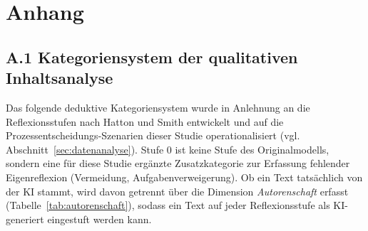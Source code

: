 \chapter*{Anhang}

\setcounter{table}{0}
\setcounter{figure}{0}
\renewcommand{\thetable}{A.\arabic{table}}
\renewcommand{\thefigure}{A.\arabic{figure}}

\section*{A.1 Kategoriensystem der qualitativen Inhaltsanalyse}
\label{app:kategoriensystem}

Das folgende deduktive Kategoriensystem wurde in Anlehnung an die Reflexionsstufen nach Hatton und
Smith \cite{hattonSmithReflectionTeacherEducation1995} entwickelt und auf die
Prozessentscheidungs-Szenarien dieser Studie operationalisiert (vgl. Abschnitt~\ref{sec:datenanalyse}).
Stufe 0 ist keine Stufe des Originalmodells, sondern eine für diese Studie ergänzte
Zusatzkategorie zur Erfassung fehlender Eigenreflexion (Vermeidung, Aufgabenverweigerung). Ob ein
Text tatsächlich von der KI stammt, wird davon getrennt über die Dimension \emph{Autorenschaft}
erfasst (Tabelle~\ref{tab:autorenschaft}), sodass ein Text auf jeder Reflexionsstufe als
KI-generiert eingestuft werden kann.

